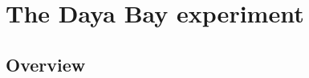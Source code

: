 \documentclass[../thesis.tex]{subfiles}
\begin{document}
\chapter{The Daya Bay experiment}
\label{chap:experim}

\section{Overview}
\label{sec:expOverview}
\end{document}
